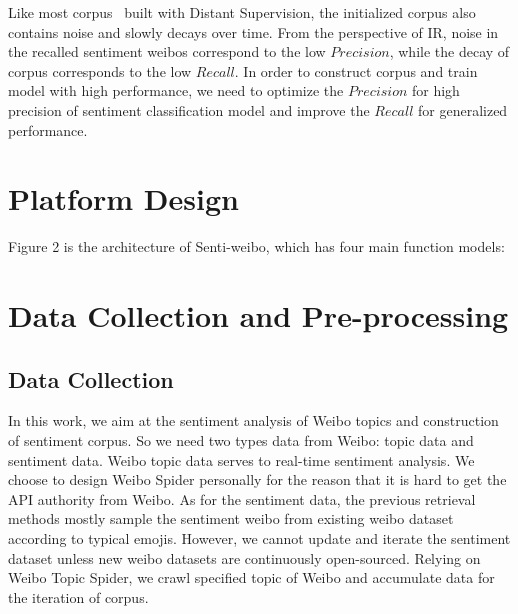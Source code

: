 \documentclass[runningheads]{llncs}
\begin{document}
Like most corpus~\cite{go2009twitter,pak2010twitter,iosifidis2017large} built with Distant Supervision, the initialized corpus also contains noise and slowly decays over time. From the perspective of IR, noise in the recalled sentiment weibos correspond to the low $Precision$, while the decay of corpus corresponds to the low $Recall$. In order to construct corpus and train model with high performance, we need to optimize the $Precision$ for high precision of sentiment classification model and improve the $Recall$ for generalized performance.



\section{Platform Design}
Figure 2 is the architecture of Senti-weibo, which has four main function models: \textit{}

\section{Data Collection and Pre-processing}

\subsection{Data Collection}

In this work, we aim at the sentiment analysis of Weibo topics and construction of sentiment corpus. So we need two types data from Weibo: topic data and sentiment data. Weibo topic data serves to real-time sentiment analysis. We choose to design Weibo Spider personally for the reason that it is hard to get the API authority from Weibo. As for the sentiment data, the previous retrieval methods mostly sample the sentiment weibo from existing weibo dataset according to typical emojis. However, we cannot update and iterate the sentiment dataset unless new weibo datasets are continuously open-sourced. Relying on Weibo Topic Spider, we crawl specified topic of Weibo and accumulate data for the iteration of corpus.
\end{document}
